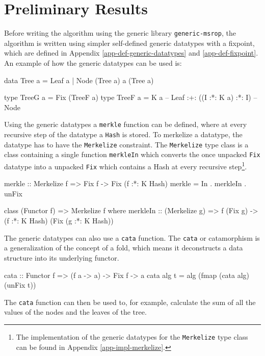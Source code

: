 \section{Preliminary Results}
Before writing the algorithm using the generic library \texttt{generic-msrop}\cite{miraldo2018sums}, the algorithm is written using simpler self-defined generic datatypes with a fixpoint, which are defined in Appendix \ref{app-def-generic-datatypes} and \ref{app-def-fixpoint}. An example of how the generic datatypes can be used is:
\begin{haskell}
data Tree a = Leaf a
            | Node (Tree a) a (Tree a)

type TreeG a = Fix (TreeF a)
type TreeF a = K a                  -- Leaf
            :+: ((I :*: K a) :*: I) -- Node
\end{haskell}

Using the generic datatypes a \texttt{merkle} function can be defined, where at every recursive step of the datatype a \texttt{Hash} is stored. To merkelize a datatype, the datatype has to have the \texttt{Merkelize} constraint. The \texttt{Merkelize} type class is a class containing a single function \texttt{merkleIn} which converts the once unpacked \texttt{Fix} datatype into a unpacked \texttt{Fix} which contains a Hash at every recursive step\footnote{The implementation of the generic datatypes for the \texttt{Merkelize} type class can be found in Appendix \ref{app-impl-merkelize}.}.

\begin{haskell}
merkle :: Merkelize f => Fix f -> Fix (f :*: K Hash)
merkle = In . merkleIn . unFix
\end{haskell}
\begin{haskell}
class (Functor f) => Merkelize f where
  merkleIn :: (Merkelize g) 
           => f (Fix g) -> (f :*: K Hash) (Fix (g :*: K Hash))
\end{haskell}

The generic datatypes can also use a \texttt{cata} function. The \texttt{cata} or catamorphism is a generalization of the concept of a fold, which means it deconstructs a data structure into its underlying functor\cite{HaskellWikiCatamorphism}.

\begin{haskell}
cata :: Functor f => (f a -> a) -> Fix f -> a
cata alg t = alg (fmap (cata alg) (unFix t)) 
\end{haskell}

The \texttt{cata} function can then be used to, for example, calculate the sum of all the values of the nodes and the leaves of the tree.

